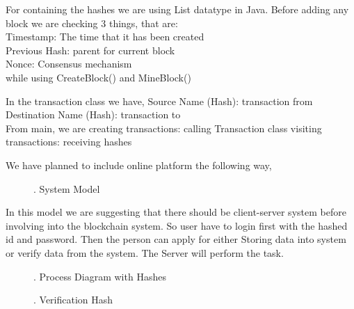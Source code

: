 For containing the hashes we are using List datatype in Java. Before adding any block we are checking 3 things, that are:\\
Timestamp: The time that it has been created\\
Previous Hash: parent for current block\\
Nonce: Consensus mechanism\\

while using CreateBlock() and MineBlock()

In the transaction class we have,
	Source Name (Hash): transaction from\\
	Destination Name (Hash): transaction to\\

From main, we are
	creating transactions: calling Transaction class
	visiting transactions: receiving hashes


We have planned to include online platform the following way,

\begin{figure}[!htb]
\caption{\label{fig:my-label}. System Model}
\end{figure}

In this model we are suggesting that there should be client-server system before involving into the blockchain system. So user have to login first with the hashed id and password. Then the person can apply for either Storing data into system or verify data from the system. The Server will perform the task.\\

\begin{figure}[!htb]
\caption{\label{fig:my-label}. Process Diagram with Hashes}
\end{figure}

\begin{figure}[!htb]
\caption{\label{fig:my-label}. Verification Hash}
\end{figure}

